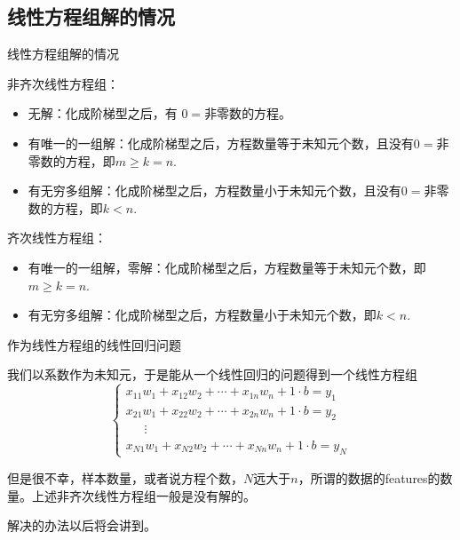
\subsection{线性方程组解的情况} 


\begin{frame}{线性方程组解的情况}

非齐次线性方程组：
\begin{itemize}
\item 无解：{\color{red}化成阶梯型之后}，有{\color{red} $0 = $非零数}的方程。
\item 有唯一的一组解：{\color{red}化成阶梯型之后}，方程数量等于未知元个数，且{\color{red}没有$0 = $非零数}的方程，即$m \geqslant k = n.$
\item 有无穷多组解：{\color{red}化成阶梯型之后}，方程数量小于未知元个数，且{\color{red}没有$0 = $非零数}的方程，即$k < n.$
\end{itemize}

\vspace{1em}
\pause

齐次线性方程组：
\begin{itemize}
\item 有唯一的一组解，零解：{\color{red}化成阶梯型之后}，方程数量等于未知元个数，即$m \geqslant k = n.$
\item 有无穷多组解：{\color{red}化成阶梯型之后}，方程数量小于未知元个数，即$k < n.$
\end{itemize}

\end{frame}


\begin{frame}{作为线性方程组的线性回归问题}

我们以系数作为未知元，于是能从一个线性回归的问题得到一个线性方程组
$$
\begin{cases}
x_{11}w_1 + x_{12}w_2 + \cdots + x_{1n}w_n + 1\cdot b = y_1 \\
x_{21}w_1 + x_{22}w_2 + \cdots + x_{2n}w_n + 1\cdot b = y_2 \\
\phantom{yyy} \vdots \\
x_{N1}w_1 + x_{N2}w_2 + \cdots + x_{Nn}w_n + 1\cdot b = y_N
\end{cases}$$

\pause

但是很不幸，样本数量，或者说方程个数，$N$远大于$n$，所谓的数据的features的数量。上述非齐次线性方程组一般是没有解的。

解决的办法以后将会讲到。

\end{frame}

